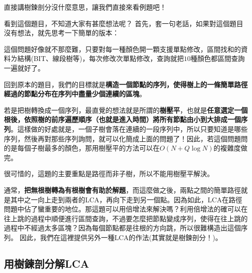 	直接講樹鍊剖分沒什麼意思，讓我們直接來看例題吧！
	
	看到這個題目，不知道大家有甚麼想法呢？
	首先，套一句老話，如果對這個題目沒有想法，就先思考一下簡單的版本：

	這個問題好像就不那麼難，只要對每一種顏色開一顆支援單點修改，區間找和的資料ㄌ結構(BIT、線段樹等)，每次修改次單點修改，查詢就把$10$種顏色都區間查詢一遍就好了。
	
	回到原本的題目，我們的目標就是\textbf{構造一個節點的序列，使得樹上的一條簡單路徑經過的節點分布在序列中盡量少個連續的區塊}。
	
	若是把樹轉換成一個序列，最直覺的想法就是所謂的\textbf{樹壓平}，也就是\textbf{任意選定一個根後，依照樹的前序遍歷順序（也就是進入時間）將所有節點由小到大排成一個序列}。這樣做的好處就是，一個子樹會落在連續的一段序列中，所以只要知道是哪些序列，然後再對那些序列詢問，就可以化簡成上面的問題了！因此，若這個問題問的是每個子樹最多的顏色，那用樹壓平的方法可以在$O(N+Q\log N)$的複雜度做完。
	
	很可惜的，這題的主要重點是路徑而非子樹，所以不能用樹壓平解決。
	
	通常，\textbf{把無根樹轉為有根樹會有助於解題}，而這麼做之後，兩點之間的簡單路徑就是其中之一向上走到兩者的LCA，再向下走到另一個點。因為如此，LCA在路徑問題中佔了蠻重要的地位。那這題可以用倍增法來解決嗎？利用倍增法的確可以在往上跳的過程中順便進行區間查詢，不過要怎麼把節點變成序列，使得在往上跳的過程中不經過太多區塊？因為每個節點都是往根的方向跳，所以很難構造出這個序列。
	因此，我們在這裡提供另外一種LCA的作法(其實就是樹鍊剖分！)。
	\subsection{用樹鍊剖分解LCA}
	
